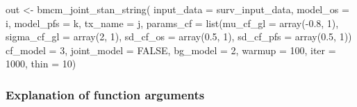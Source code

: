 \documentclass[
]{article}
\newenvironment{Shaded}{\begin{snugshade}}{\end{snugshade}}
\newcommand{\AttributeTok}[1]{\textcolor[rgb]{0.77,0.63,0.00}{#1}}
\newcommand{\ConstantTok}[1]{\textcolor[rgb]{0.00,0.00,0.00}{#1}}
\newcommand{\DecValTok}[1]{\textcolor[rgb]{0.00,0.00,0.81}{#1}}
\newcommand{\FloatTok}[1]{\textcolor[rgb]{0.00,0.00,0.81}{#1}}
\newcommand{\FunctionTok}[1]{\textcolor[rgb]{0.00,0.00,0.00}{#1}}
\newcommand{\NormalTok}[1]{#1}
\newcommand{\OtherTok}[1]{\textcolor[rgb]{0.56,0.35,0.01}{#1}}
\newcommand{\SpecialCharTok}[1]{\textcolor[rgb]{0.00,0.00,0.00}{#1}}
\begin{document}
\begin{Shaded}
\begin{Highlighting}[]
\NormalTok{out }\OtherTok{\textless{}{-}}
  \FunctionTok{bmcm\_joint\_stan\_string}\NormalTok{(}
    \AttributeTok{input\_data =}\NormalTok{ surv\_input\_data,}
    \AttributeTok{model\_os =}\NormalTok{ i,}
    \AttributeTok{model\_pfs =}\NormalTok{ k,}
    \AttributeTok{tx\_name =}\NormalTok{ j,}
    \AttributeTok{params\_cf =}
      \FunctionTok{list}\NormalTok{(}\AttributeTok{mu\_cf\_gl =} \FunctionTok{array}\NormalTok{(}\SpecialCharTok{{-}}\FloatTok{0.8}\NormalTok{, }\DecValTok{1}\NormalTok{),}
           \AttributeTok{sigma\_cf\_gl =} \FunctionTok{array}\NormalTok{(}\DecValTok{2}\NormalTok{, }\DecValTok{1}\NormalTok{),}
           \AttributeTok{sd\_cf\_os =} \FunctionTok{array}\NormalTok{(}\FloatTok{0.5}\NormalTok{, }\DecValTok{1}\NormalTok{),}
           \AttributeTok{sd\_cf\_pfs =} \FunctionTok{array}\NormalTok{(}\FloatTok{0.5}\NormalTok{, }\DecValTok{1}\NormalTok{))}
    \AttributeTok{cf\_model =} \DecValTok{3}\NormalTok{,}
    \AttributeTok{joint\_model =} \ConstantTok{FALSE}\NormalTok{,}
    \AttributeTok{bg\_model =} \DecValTok{2}\NormalTok{,}
    \AttributeTok{warmup =} \DecValTok{100}\NormalTok{,}
    \AttributeTok{iter =} \DecValTok{1000}\NormalTok{,}
    \AttributeTok{thin =} \DecValTok{10}\NormalTok{)}
\end{Highlighting}
\end{Shaded}

\hypertarget{explanation-of-function-arguments}{%
\subsubsection{Explanation of function
arguments}\label{explanation-of-function-arguments}}
\end{document}
